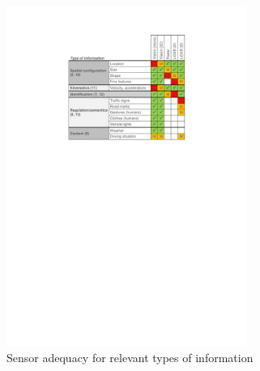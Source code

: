 %    




\begin{figure}[h]
    \centering
    \includegraphics[width=0.7\textwidth]{"img/information_types_sensors"}
    \caption{Sensor adequacy for relevant types of information}
    \label{fig:information_vs_sensors}
\end{figure}
